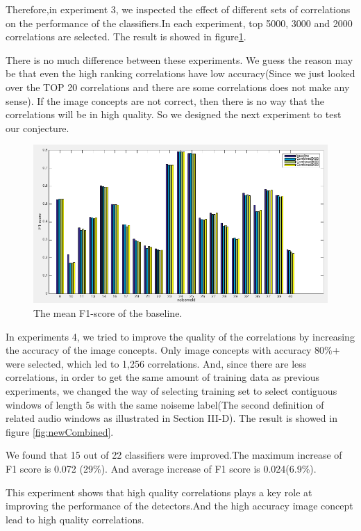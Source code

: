 \documentclass[conference, 11pt, onecolumn]{IEEEtran}
\begin{document}
Therefore,in experiment 3, we inspected the effect of different sets of correlations on the performance of the classifiers.In each experiment, top 5000, 3000 and 2000 correlations are selected. 
The result is showed in figure\ref{fig:diffCorrelations}.

There is no much difference between these experiments. We guess the reason may be that even the high ranking correlations have low accuracy(Since we just looked over the TOP 20 correlations and there are some correlations does not make any sense). If the image concepts are not correct, then there is no way that the correlations will be in high quality. So we designed the next experiment to test our conjecture.

\begin{figure}[h!]
\centering
\includegraphics[scale=0.45]{figure/diffCorrelations.png}
\caption{The mean F1-score of the baseline.}
\label{fig:diffCorrelations}
\end{figure}
 
In experiments 4, we tried to improve the quality of the correlations by increasing the accuracy of the image concepts.
Only image concepts with accuracy 80\%+ were selected, which led to 1,256 correlations. And,
since there are less correlations, in order to get the same amount of training data as previous experiments, we changed the way of selecting training set to select contiguous windows of length 5s with the same noiseme label(The second definition of related audio windows as illustrated in Section III-D).
The result is showed in figure \ref{fig:newCombined}. 

We found that 15 out of 22 classifiers were improved.The maximum increase of F1 score is 0.072 (29\%). And average increase of F1 score is 0.024(6.9\%). 

This experiment shows that high quality correlations plays a key role at improving the performance of the detectors.And the high accuracy image concept lead to high quality correlations.
\end{document}

